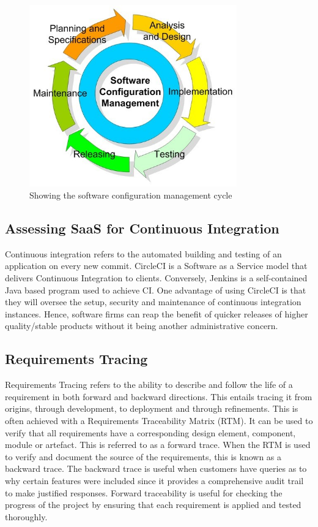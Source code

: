 \documentclass{article}
\begin{document}
    \begin{figure}[ht!]
    	\includegraphics[width=0.8\textwidth, right]{images/cycle.jpg}
    	\caption{Showing the software configuration management cycle\cite{gcready}}
    \end{figure}
   
   \subsection{Assessing SaaS for Continuous Integration }
    Continuous integration refers to the automated building and testing of an application on every new commit. CircleCI is a Software as a Service model that delivers Continuous Integration to clients. Conversely, Jenkins is a self-contained Java based program used to achieve CI. One advantage of using CircleCI is that they will oversee the setup, security and maintenance of continuous integration instances. Hence, software firms can reap the benefit of quicker releases of higher quality/stable products without it being another administrative concern. \cite{contin}
\subsection{Requirements Tracing}
    Requirements Tracing refers to the ability to describe and follow the life of a requirement in both forward and backward directions. This entails tracing it from origins, through development, to deployment and through refinements. This is often achieved with a Requirements Traceability Matrix (RTM). It can be used to verify that all requirements have a corresponding design element, component, module or artefact. This is referred to as a forward trace. When the RTM is used to verify and document the source of the requirements, this is known as a backward trace. The backward trace is useful when customers have queries as to why certain features were included since it provides a comprehensive audit trail to make justified responses. Forward traceability is useful for checking the progress of the project by ensuring that each requirement is applied and tested thoroughly.\cite{reqtrac}
\end{document}
